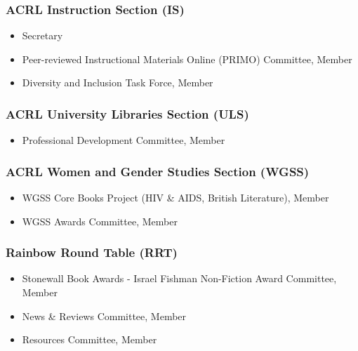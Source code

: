 \documentclass[
  letterpaper,
  DIV=11,
  numbers=noendperiod]{scrartcl}
\providecommand{\tightlist}{%
  \setlength{\itemsep}{0pt}\setlength{\parskip}{0pt}}\usepackage{longtable,booktabs,array}
\begin{document}
\subsubsection{ACRL Instruction Section
(IS)}\label{acrl-instruction-section-is}

\begin{itemize}
\tightlist
\item
  Secretary
\item
  Peer-reviewed Instructional Materials Online (PRIMO) Committee, Member
\item
  Diversity and Inclusion Task Force, Member
\end{itemize}

\subsubsection{ACRL University Libraries Section
(ULS)}\label{acrl-university-libraries-section-uls}

\begin{itemize}
\tightlist
\item
  Professional Development Committee, Member
\end{itemize}

\subsubsection{ACRL Women and Gender Studies Section
(WGSS)}\label{acrl-women-and-gender-studies-section-wgss}

\begin{itemize}
\tightlist
\item
  WGSS Core Books Project (HIV \& AIDS, British Literature), Member
\item
  WGSS Awards Committee, Member
\end{itemize}

\subsubsection{Rainbow Round Table (RRT)}\label{rainbow-round-table-rrt}

\begin{itemize}
\tightlist
\item
  Stonewall Book Awards - Israel Fishman Non-Fiction Award Committee,
  Member
\item
  News \& Reviews Committee, Member
\item
  Resources Committee, Member
\end{itemize}
\end{document}
